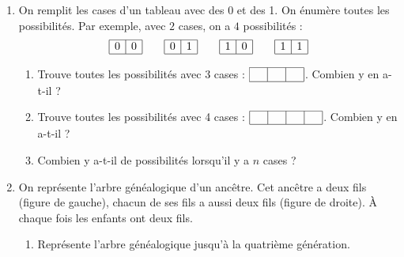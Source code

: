 \documentclass[class=report,crop=false, 12pt]{standalone}
\begin{document}
\begin{activite}
\sauteligne
\begin{enumerate}
  \item On remplit les cases d'un tableau avec des 0 et des 1. On énumère toutes les possibilités.
  Par exemple, avec $2$ cases, on a $4$ possibilités :
 $$
\begin{array}{|c|c|}
  \hline
    0 &  0  \\ 
  \hline
\end{array}\qquad
\begin{array}{|c|c|}
  \hline
    0 &  1  \\ 
  \hline
\end{array}\qquad
\begin{array}{|c|c|}
  \hline
    1 &  0  \\ 
  \hline
\end{array}\qquad
\begin{array}{|c|c|}
  \hline
    1 &  1  \\ 
  \hline
\end{array}
$$ 
   \begin{enumerate}
    \item Trouve toutes les possibilités avec 3 cases :
    $\begin{array}{|c|c|c|}
  \hline
    \ \   &  \ \  & \ \   \\ 
  \hline
\end{array}
$. Combien y en a-t-il ?

    \item Trouve toutes les possibilités avec 4 cases :
    $\begin{array}{|c|c|c|c|}
  \hline
    \ \   &  \ \  & \ \  & \ \  \\ 
  \hline
\end{array}
$. Combien y en a-t-il ?


    \item Combien y a-t-il de possibilités lorsqu'il y a $n$ cases ?

  \end{enumerate}
 
  
  \item On représente l'arbre généalogique d'un ancêtre. Cet ancêtre a deux fils (figure de gauche), chacun de ses fils a aussi deux fils (figure de droite). À chaque fois les enfants ont deux fils.
  
  

  
  \begin{enumerate}
    \item Représente l'arbre généalogique jusqu'à la quatrième génération.
    

\end{enumerate}
\end{enumerate}
\end{activite}
\end{document}
